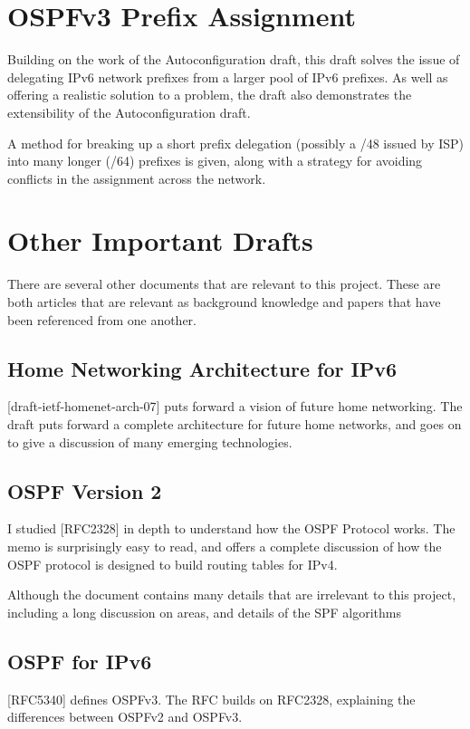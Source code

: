 \documentclass[12pt]{report}
\begin{document}
\section{OSPFv3 Prefix Assignment}
Building on the work of the Autoconfiguration draft, this draft solves
the issue of delegating IPv6 network prefixes from a larger pool of IPv6 
prefixes. As well as offering a realistic solution to a problem, the draft 
also demonstrates the extensibility of the Autoconfiguration draft. 

A method for breaking up a short prefix delegation (possibly a /48 issued by
ISP) into many longer (/64) prefixes is given, along with a strategy for
avoiding conflicts in the assignment across the network.

\section{Other Important Drafts}
There are several other documents that are relevant to this project. These are
both articles that are relevant as background knowledge and papers that have
been referenced from one another.

\subsection{Home Networking Architecture for IPv6} 
[draft-ietf-homenet-arch-07] puts forward a vision of future home networking. The 
draft puts forward a complete architecture for future home networks, and goes on to 
give a discussion of many emerging technologies. 

\subsection{OSPF Version 2}
I studied [RFC2328] in depth to understand how the OSPF Protocol works. The 
memo is surprisingly easy to read, and offers a complete discussion of how the 
OSPF protocol is designed to build routing tables for IPv4. 

Although the document contains many details that are irrelevant to this project, 
including a long discussion on areas, and details of the SPF algorithms

\subsection{OSPF for IPv6}
[RFC5340] defines OSPFv3. The RFC builds on RFC2328, explaining the differences
between OSPFv2 and OSPFv3. 
\end{document}
